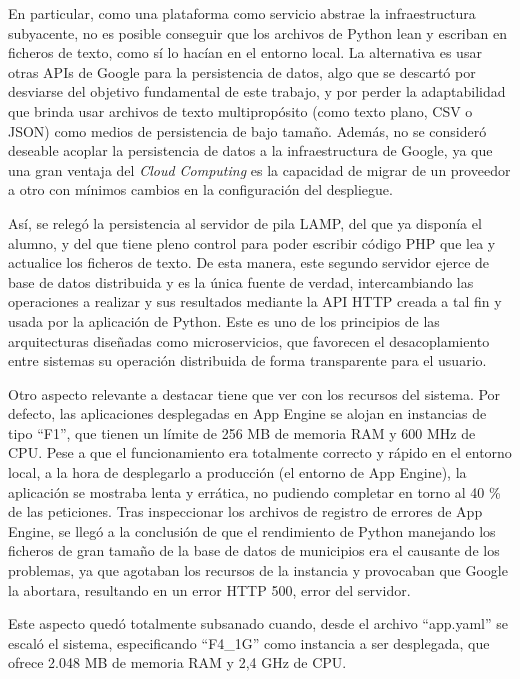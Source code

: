 En particular, como una plataforma como servicio abstrae la infraestructura subyacente, no es posible conseguir que los archivos de Python lean y escriban en ficheros de texto, como sí lo hacían en el entorno local. La alternativa es usar otras APIs de Google para la persistencia de datos, algo que se descartó por desviarse del objetivo fundamental de este trabajo, y por perder la adaptabilidad que brinda usar archivos de texto multipropósito (como texto plano, CSV o JSON) como medios de persistencia de bajo tamaño. Además, no se consideró deseable acoplar la persistencia de datos a la infraestructura de Google, ya que una gran ventaja del \textit{Cloud Computing} es la capacidad de migrar de un proveedor a otro con mínimos cambios en la configuración del despliegue.

Así, se relegó la persistencia al servidor de pila LAMP, del que ya disponía el alumno, y del que tiene pleno control para poder escribir código PHP que lea y actualice los ficheros de texto. De esta manera, este segundo servidor ejerce de base de datos distribuida y es la única fuente de verdad, intercambiando las operaciones a realizar y sus resultados mediante la API HTTP creada a tal fin y usada por la aplicación de Python. Este es uno de los principios de las arquitecturas diseñadas como microservicios, que favorecen el desacoplamiento entre sistemas su operación distribuida de forma transparente para el usuario.

Otro aspecto relevante a destacar tiene que ver con los recursos del sistema. Por defecto, las aplicaciones desplegadas en App Engine se alojan en instancias de tipo ``F1'', que tienen un límite de 256 MB de memoria RAM y 600 MHz de CPU. Pese a que el funcionamiento era totalmente correcto y rápido en el entorno local, a la hora de desplegarlo a producción (el entorno de App Engine), la aplicación se mostraba lenta y errática, no pudiendo completar en torno al 40 \% de las peticiones. Tras inspeccionar los archivos de registro de errores de App Engine, se llegó a la conclusión de que el rendimiento de Python manejando los ficheros de gran tamaño de la base de datos de municipios era el causante de los problemas, ya que agotaban los recursos de la instancia y provocaban que Google la abortara, resultando en un error HTTP 500, error del servidor.

Este aspecto quedó totalmente subsanado cuando, desde el archivo ``app.yaml'' se escaló el sistema, especificando ``F4\_1G'' como instancia a ser desplegada, que ofrece 2.048 MB de memoria RAM y 2,4 GHz de CPU.


